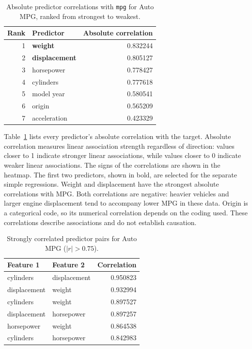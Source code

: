 \begin{table}[H]
\centering
\small
\begin{tabular}{rlr}
\toprule
Rank & Predictor & Absolute correlation \\
\midrule
1 & \textbf{weight} & 0.832244 \\
2 & \textbf{displacement} & 0.805127 \\
3 & horsepower & 0.778427 \\
4 & cylinders & 0.777618 \\
5 & model year & 0.580541 \\
6 & origin & 0.565209 \\
7 & acceleration & 0.423329 \\
\bottomrule
\end{tabular}
\caption{Absolute predictor correlations with \texttt{mpg} for Auto MPG, ranked from strongest to weakest.}
\label{tab:auto_mpg_target_corr}
\end{table}

Table~\ref{tab:auto_mpg_target_corr} lists every predictor's absolute correlation with the target. Absolute correlation measures linear association strength regardless of direction: values closer to 1 indicate stronger linear associations, while values closer to 0 indicate weaker linear associations. The signs of the correlations are shown in the heatmap. The first two predictors, shown in bold, are selected for the separate simple regressions. Weight and displacement have the strongest absolute correlations with MPG. Both correlations are negative: heavier vehicles and larger engine displacement tend to accompany lower MPG in these data. Origin is a categorical code, so its numerical correlation depends on the coding used. These correlations describe associations and do not establish causation.

\begin{table}[H]
\centering
\small
\begin{tabular}{llr}
\toprule
Feature 1 & Feature 2 & Correlation \\
\midrule
cylinders & displacement & 0.950823 \\
displacement & weight & 0.932994 \\
cylinders & weight & 0.897527 \\
displacement & horsepower & 0.897257 \\
horsepower & weight & 0.864538 \\
cylinders & horsepower & 0.842983 \\
\bottomrule
\end{tabular}
\caption{Strongly correlated predictor pairs for Auto MPG ($|r| > 0.75$).}
\label{tab:auto_mpg_predictor_pairs}
\end{table}


